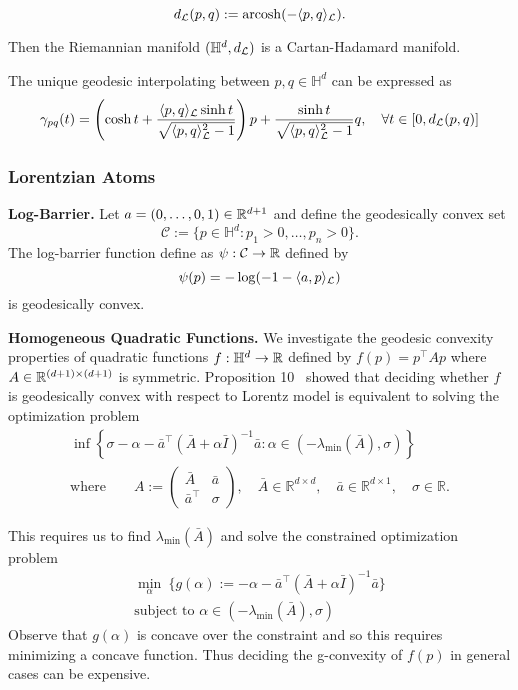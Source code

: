 \documentclass[twoside,11pt]{article}
\begin{document}
\begin{equation*}
d_{\mathcal{L}}(p, q):=\operatorname{arcosh}(-\langle p, q\rangle_{\mathcal{L}}) .  \end{equation*}

Then the Riemannian manifold $(\mathbb{H}^d, d_{\mathcal{L}})$ is a Cartan-Hadamard manifold.

The unique geodesic interpolating between $p, q \in \mathbb{H}^d$ can be expressed as
\[
\gamma_{p q}(t)=\left(\cosh t+\frac{\langle p, q\rangle_{\mathcal{L}} \sinh t}{\sqrt{\langle p, q\rangle_{\mathcal{L}}^2-1}}\right) p+\frac{\sinh t}{\sqrt{\langle p, q\rangle_{\mathcal{L}}^2-1}} q, \quad \forall t \in[0, d_{\mathcal{L}}(p, q)]
\]


\subsubsection{Lorentzian Atoms}

\textbf{Log-Barrier.} Let $a = (0, \ldots, 0, 1) \in \mathbb{R}^{d+1}$ and define the geodesically convex set 
\[
\mathcal{C} := \{p \in \mathbb{H}^d: p_1 > 0, \ldots, p_n >0 \}. 
\]
The log-barrier function define as $\psi: \mathcal{C} \to \mathbb{R}$ defined by 
\[
\psi(p)=-\log  (-1-\langle a, p\rangle_{\mathcal{L}})
\]
is geodesically convex.



\textbf{Homogeneous Quadratic Functions.}  
We investigate the geodesic convexity properties of quadratic functions $f: \mathbb{H}^{d} \to \mathbb{R}$ defined by $f(p) = p^\top A p$ where $A \in \mathbb{R}^{(d+1) \times (d+1)}$ is symmetric. Proposition 10~\citep{Ferreira2022} showed that deciding whether $f$ is geodesically convex with respect to Lorentz model is equivalent to solving the optimization problem 
\[
\begin{gathered}
    \inf \left\{\sigma-\alpha-\bar{a}^{\top}(\bar{A}+\alpha \bar{I})^{-1} \bar{a}: \alpha \in\left(-\lambda_{\min }(\bar{A}), \sigma\right)\right\} 
    \\
    \text{where} \qquad A:=\left(\begin{array}{cc}
\bar{A} & \bar{a} \\
\bar{a}^{\top} & \sigma
\end{array}\right), \quad \bar{A} \in \mathbb{R}^{d \times d}, \quad \bar{a} \in \mathbb{R}^{d \times 1}, \quad \sigma \in \mathbb{R}.
\end{gathered}
\]

This requires us to find $\lambda_{\min}(\bar{A})$ and solve the constrained optimization problem 
\[
\begin{gathered}
\min_{\alpha} \ \{g(\alpha) := - \alpha - \bar{a}^{\top}(\bar{A}+\alpha \bar{I})^{-1} \bar{a}\}
\\ \text{subject to }  \alpha \in\left(-\lambda_{\min }(\bar{A}), \sigma\right)
\end{gathered}
\]
Observe that $g(\alpha)$ is concave over the constraint and so this requires minimizing a concave function. Thus deciding the g-convexity of $f(p)$ in general cases can be expensive.
\end{document}
